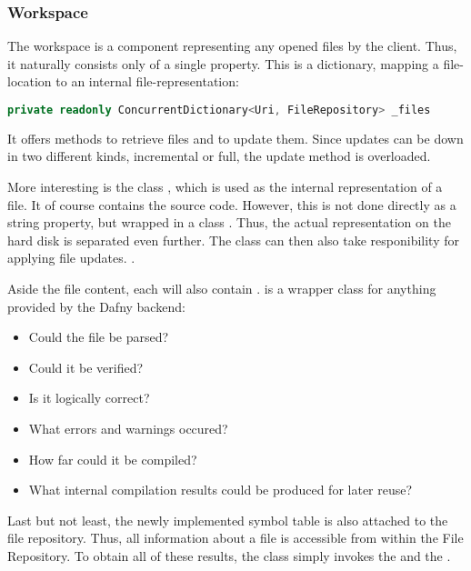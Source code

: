 \subsubsection{Workspace}
The workspace is a component representing any opened files by the client. Thus, it naturally consists only of a single property. This is a dictionary, mapping a file-location to an internal file-representation:

\begin{lstlisting}[language=csharp, caption={Workspace Property}, captionpos=b, label={lst:workspaceproperty}]
private readonly ConcurrentDictionary<Uri, FileRepository> _files
\end{lstlisting}

It offers methods to retrieve files and to update them.  Since updates can be down in two different kinds, incremental or full, the update method is overloaded.

More interesting is the class , which is used as the internal representation of a file. It of course contains the source code. However, this is not done directly as a string property, but wrapped in a class . Thus, the actual representation on the hard disk is separated even further. The  class can then also take responibility for applying file updates.
.

Aside the file content, each  will also contain .  is a wrapper class for anything provided by the Dafny backend:
\begin{itemize}
    \item Could the file be parsed?
    \item Could it be verified?
    \item Is it logically correct?
    \item What errors and warnings occured?
    \item How far could it be compiled?
    \item What internal compilation results could be produced for later reuse?
\end{itemize}

Last but not least, the newly implemented symbol table is also attached to the file repository. Thus, all information about a file is accessible from within the File Repository. To obtain all of these results, the class simply invokes the  and the .

